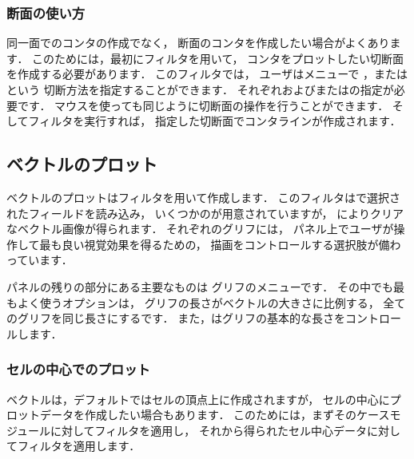 \subsubsection{断面の使い方}
\label{sssec:6.1.6.1}
同一面でのコンタの作成でなく，
断面のコンタを作成したい場合がよくあります．
このためには，最初にフィルタを用いて，
コンタをプロットしたい切断面を作成する必要があります．
このフィルタでは，
ユーザはメニューで
，またはという
切断方法を指定することができます．
%
それぞれおよびまたはの指定が必要です．
マウスを使っても同じように切断面の操作を行うことができます．
そしてフィルタを実行すれば，
指定した切断面でコンタラインが作成されます．

\subsection{ベクトルのプロット}
\label{ssec:6.1.7}
ベクトルのプロットはフィルタを用いて作成します．
このフィルタはで選択されたフィールドを読み込み，
いくつかのが用意されていますが，
によりクリアなベクトル画像が得られます．
それぞれのグリフには，
パネル上でユーザが操作して最も良い視覚効果を得るための，
描画をコントロールする選択肢が備わっています．

パネルの残りの部分にある主要なものは
グリフのメニューです．
その中でも最もよく使うオプションは，
グリフの長さがベクトルの大きさに比例する，
全てのグリフを同じ長さにするです．
また，はグリフの基本的な長さをコントロールします．

\subsubsection{セルの中心でのプロット}
\label{sssec:6.1.7.1}
ベクトルは，デフォルトではセルの頂点上に作成されますが，
セルの中心にプロットデータを作成したい場合もあります．
このためには，まずそのケースモジュールに対してフィルタを適用し，
それから得られたセル中心データに対してフィルタを適用します．

